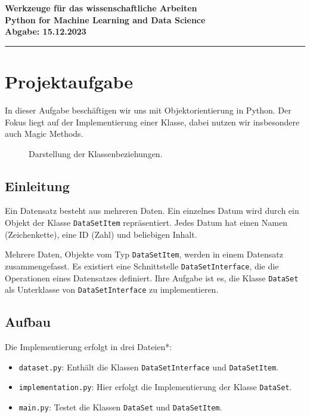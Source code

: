 \documentclass[a4paper,12pt]{article}
\begin{document}
\begin{titlepage}
    \vspace*{1cm}
    \bfseries\LARGE
    Werkzeuge für das wissenschaftliche Arbeiten\\[1em]
    \Large Python for Machine Learning and Data Science\\[2em]
    \normalsize\normalfont
    \hfill Abgabe: 15.12.2023
    
    \vfill
    \hrule
\end{titlepage}

\tableofcontents

\section{Projektaufgabe}
In dieser Aufgabe beschäftigen wir uns mit Objektorientierung in Python. Der Fokus liegt auf der Implementierung einer Klasse, dabei nutzen wir insbesondere auch Magic Methods.

\begin{figure}[h!]
    \centering
    
    \caption{Darstellung der Klassenbeziehungen.}
    \label{fig:classes}
\end{figure}

\subsection{Einleitung}
Ein Datensatz besteht aus mehreren Daten. Ein einzelnes Datum wird durch ein Objekt der Klasse \texttt{DataSetItem} repräsentiert. Jedes Datum hat einen Namen (Zeichenkette), eine ID (Zahl) und beliebigen Inhalt.

Mehrere Daten, Objekte vom Typ \texttt{DataSetItem}, werden in einem Datensatz zusammengefasst. Es existiert eine Schnittstelle \texttt{DataSetInterface}, die die Operationen eines Datensatzes definiert. Ihre Aufgabe ist es, die Klasse \texttt{DataSet} als Unterklasse von \texttt{DataSetInterface} zu implementieren.

\subsection{Aufbau}
Die Implementierung erfolgt in drei Dateien*:
\begin{itemize}
    \item \texttt{dataset.py}: Enthält die Klassen \texttt{DataSetInterface} und \texttt{DataSetItem}.
    \item \texttt{implementation.py}: Hier erfolgt die Implementierung der Klasse \texttt{DataSet}.
    \item \texttt{main.py}: Testet die Klassen \texttt{DataSet} und \texttt{DataSetItem}.
\end{itemize}
\end{document}
